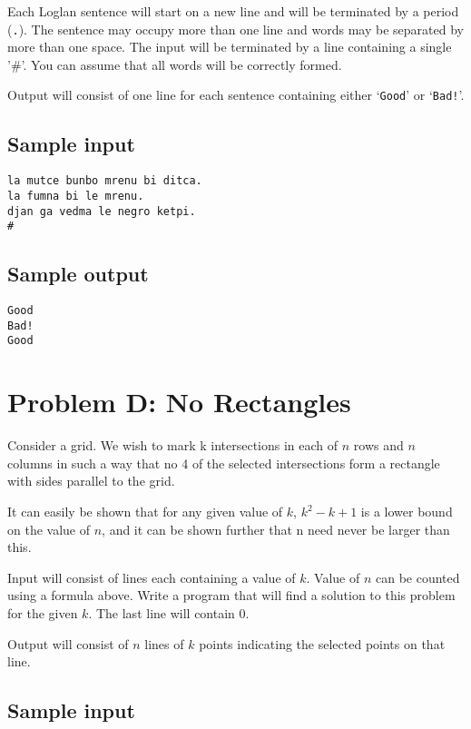Each Loglan sentence will start on a new line and will be terminated
by a period (\verb|.|).  The sentence may occupy more than one line and words
may be separated by more than one space.  The input will be terminated
by a line containing a single '\#'.  You can assume that all words will
be correctly formed.

Output will consist of one line for each sentence containing 
either `\verb|Good|' or `\verb|Bad!|'.

\subsection*{Sample input}

\begin{verbatim}
la mutce bunbo mrenu bi ditca.
la fumna bi le mrenu.
djan ga vedma le negro ketpi.
#
\end{verbatim}

\subsection*{Sample output}

\begin{verbatim}
Good
Bad!
Good
\end{verbatim}

\newpage

\section*{Problem D: No Rectangles}

Consider a grid.  We wish to mark k
intersections in each of $n$ rows and $n$ columns in such a way that
no 4 of the selected intersections form a rectangle with sides
parallel to the grid.

It can easily be shown that for any given value of $k$, $k^2 - k +
1$ is a lower bound on the value of $n$, and it can be shown further
that n need never be larger than this.

Input will consist of lines each containing a value of $k$. 
Value of $n$ can be counted using a formula above. Write a program
that will find a solution to this problem for the given $k$.
The last line will contain 0.

Output will consist of $n$ lines of $k$ points indicating the selected
points on that line.

\subsection*{Sample input}

